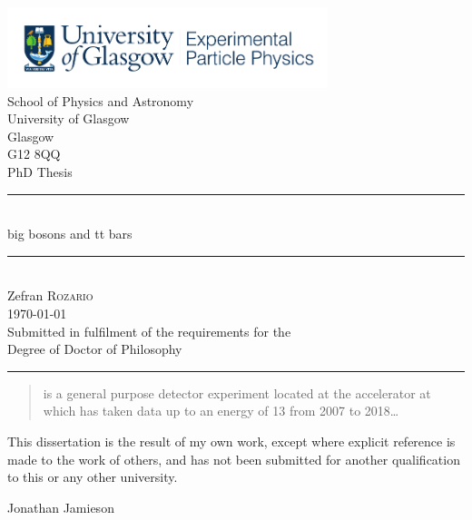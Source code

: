 \thispagestyle{empty}%

	\begin{center} %
	\includegraphics[width=0.7\textwidth]{ExperPartPhys_colour.pdf}~\\[4mm]%
	School of Physics and Astronomy\\
	University of Glasgow\\
	Glasgow\\
	G12 8QQ\\[8mm] %

    {\Large PhD Thesis}
	\rule[0.4cm]{15cm}{.2pt}\\ %

	{\Huge big bosons and tt bars}\\[1cm] %
	\rule[0.4cm]{15cm}{.2pt}\\[4cm] %
	{\LARGE Zefran \textsc{Rozario}}\\[1cm] %
	{\small \today}\\[1cm] %
	{\small 
		Submitted in fulfilment of the requirements for the\\
		Degree of Doctor of Philosophy}\\[1cm] %
	\rule[0.4cm]{15cm}{.2pt} 
	\end{center}
\begin{abstract}%
  \ATLAS is a general purpose detector experiment located at the \LHC accelerator at \CERN which has taken data up to an energy of \unit{13}{\TeV} from 2007 to 2018\dots
\end{abstract}


\begin{declaration}
  This dissertation is the result of my own work, except where explicit
  reference is made to the work of others, and has not been submitted
  for another qualification to this or any other university.
  \vspace*{1cm}
  \begin{flushright}
    Jonathan Jamieson
  \end{flushright}
\end{declaration}


